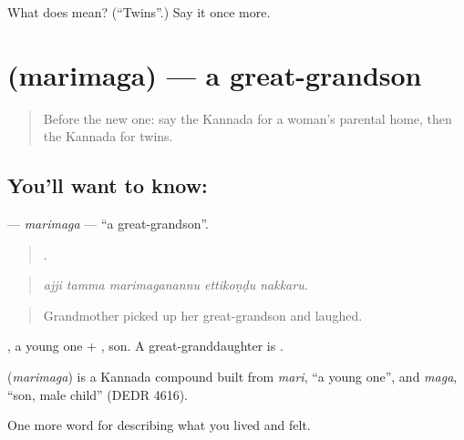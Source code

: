 \begin{tcolorbox}[breakable,colback=teal!4,colframe=teal!35!black,title={Before you move on}]
What does  mean? (\textquotedblleft{}Twins\textquotedblright{}.) Say it once more.
\end{tcolorbox}
\section[\texorpdfstring{\kn{ಮರಿಮಗ} (marimaga)}{ಮರಿಮಗ (marimaga)}]{ (marimaga) — a great-grandson}

\label{lesson:KA-C526-marimaga}



\begin{quote}
Before the new one: say the Kannada for a woman's parental home, then the Kannada for twins.
\end{quote}

\subsection*{You'll want to know: }
\textbf{} — \emph{marimaga} — \textquotedblleft{}a great-grandson\textquotedblright{}.

\begin{quote}
    .
\end{quote}

\begin{quote}
\emph{ajji tamma marimaganannu ettikoṇḍu nakkaru.}
\end{quote}

\begin{quote}
Grandmother picked up her great-grandson and laughed.
\end{quote}

, a young one + , son. A great-granddaughter is .

\begin{cousinweb}
\textbf{} (\emph{marimaga}) is a Kannada compound built from \emph{mari}, \textquotedblleft{}a young one\textquotedblright{}, and \emph{maga}, \textquotedblleft{}son, male child\textquotedblright{} (DEDR 4616).
\end{cousinweb}

\begin{grammarlens}[title={What you've built}]
One more word for describing what you lived and felt.
\end{grammarlens}


